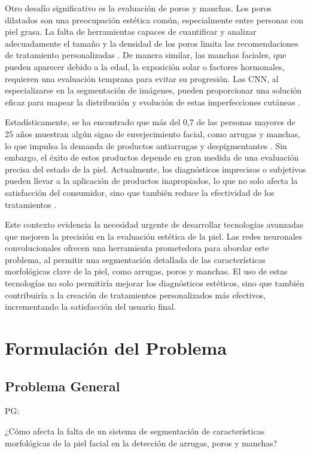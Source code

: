 Otro desafío significativo es la evaluación de poros y manchas. Los poros dilatados son una preocupación estética común, especialmente entre personas con piel grasa. La falta de herramientas capaces de cuantificar y analizar adecuadamente el tamaño y la densidad de los poros limita las recomendaciones de tratamiento personalizadas \parencite{jia2019}. De manera similar, las manchas faciales, que pueden aparecer debido a la edad, la exposición solar o factores hormonales, requieren una evaluación temprana para evitar su progresión. Las CNN, al especializarse en la segmentación de imágenes, pueden proporcionar una solución eficaz para mapear la distribución y evolución de estas imperfecciones cutáneas \parencite{esteva2017}.

Estadísticamente, se ha encontrado que más del 0,7 de las personas mayores de 25 años muestran algún signo de envejecimiento facial, como arrugas y manchas, lo que impulsa la demanda de productos antiarrugas y despigmentantes \parencite{aad2022}. Sin embargo, el éxito de estos productos depende en gran medida de una evaluación precisa del estado de la piel. Actualmente, los diagnósticos imprecisos o subjetivos pueden llevar a la aplicación de productos inapropiados, lo que no solo afecta la satisfacción del consumidor, sino que también reduce la efectividad de los tratamientos \parencite{khatri2018}.

Este contexto evidencia la necesidad urgente de desarrollar tecnologías avanzadas que mejoren la precisión en la evaluación estética de la piel. Las redes neuronales convolucionales ofrecen una herramienta prometedora para abordar este problema, al permitir una segmentación detallada de las características morfológicas clave de la piel, como arrugas, poros y manchas. El uso de estas tecnologías no solo permitiría mejorar los diagnósticos estéticos, sino que también contribuiría a la creación de tratamientos personalizados más efectivos, incrementando la satisfacción del usuario final.



\section{Formulación del Problema}

\subsection{Problema General}
PG: \newcommand{\ProblemaGeneral}{
¿Cómo afecta la falta de un sistema de segmentación  de características morfológicas de la piel facial en la detección de arrugas, poros y manchas?
}
\ProblemaGeneral
